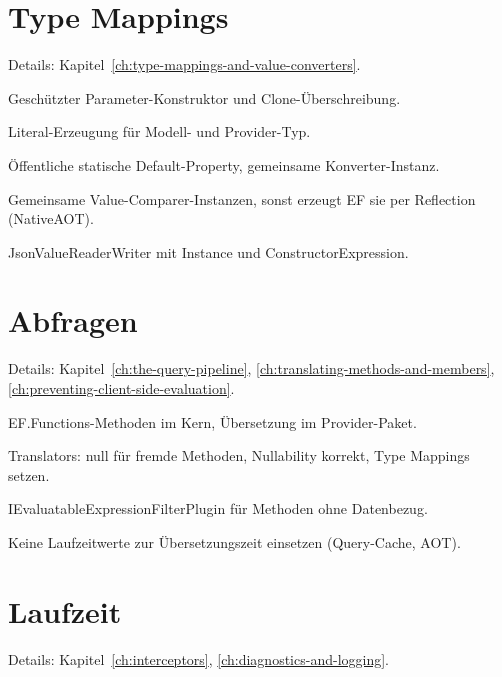 \section{Type Mappings}

\noindent Details: Kapitel~\ref{ch:type-mappings-and-value-converters}.

\begin{checklist}
  \item Geschützter Parameter-Konstruktor und Clone-Überschreibung.
  \item Literal-Erzeugung für Modell- und Provider-Typ.
  \item Öffentliche statische Default-Property, gemeinsame Konverter-Instanz.
  \item Gemeinsame Value-Comparer-Instanzen, sonst erzeugt EF sie per Reflection (NativeAOT).
  \item JsonValueReaderWriter mit Instance und ConstructorExpression.
\end{checklist}

\section{Abfragen}

\noindent Details: Kapitel~\ref{ch:the-query-pipeline}, \ref{ch:translating-methods-and-members}, \ref{ch:preventing-client-side-evaluation}.

\begin{checklist}
  \item EF.Functions-Methoden im Kern, Übersetzung im Provider-Paket.
  \item Translators: null für fremde Methoden, Nullability korrekt, Type Mappings setzen.
  \item IEvaluatableExpressionFilterPlugin für Methoden ohne Datenbezug.
  \item Keine Laufzeitwerte zur Übersetzungszeit einsetzen (Query-Cache, AOT).
\end{checklist}

\section{Laufzeit}

\noindent Details: Kapitel~\ref{ch:interceptors}, \ref{ch:diagnostics-and-logging}.

